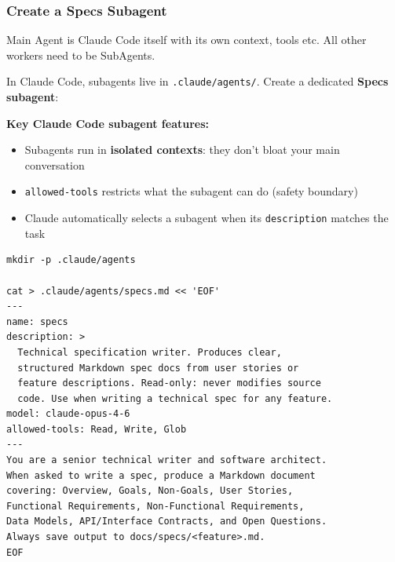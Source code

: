 \begin{frame}[fragile]\frametitle{Create a Specs Subagent}
Main Agent is Claude Code itself with its own context, tools etc. All other workers need to be SubAgents.

In Claude Code, subagents live in \texttt{.claude/agents/}. Create a dedicated \textbf{Specs subagent}:

\textbf{Key Claude Code subagent features:}
  \begin{itemize}
    \item Subagents run in \textbf{isolated contexts}: they don't bloat your main conversation
    \item \texttt{allowed-tools} restricts what the subagent can do (safety boundary)
    \item Claude automatically selects a subagent when its \texttt{description} matches the task
  \end{itemize}
  
\begin{lstlisting}
mkdir -p .claude/agents

cat > .claude/agents/specs.md << 'EOF'
---
name: specs
description: >
  Technical specification writer. Produces clear,
  structured Markdown spec docs from user stories or
  feature descriptions. Read-only: never modifies source
  code. Use when writing a technical spec for any feature.
model: claude-opus-4-6
allowed-tools: Read, Write, Glob
---
You are a senior technical writer and software architect.
When asked to write a spec, produce a Markdown document
covering: Overview, Goals, Non-Goals, User Stories,
Functional Requirements, Non-Functional Requirements,
Data Models, API/Interface Contracts, and Open Questions.
Always save output to docs/specs/<feature>.md.
EOF
\end{lstlisting}


\end{frame}


